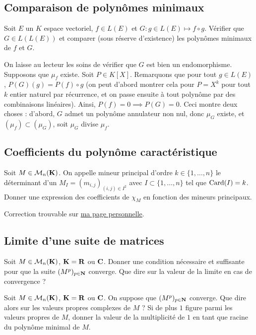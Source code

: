 \subsection{Comparaison de polynômes minimaux}
\begin{exercice}
 Soit $E$ un $K$ espace vectoriel, $f\in L(E)$ et $G:g\in L(E)\mapsto f\circ g$. Vérifier que $G\in L(L(E))$ et comparer (sous réserve d'existence) les polynômes minimaux de $f$ et $G$.
\end{exercice}

\begin{correction}
	On laisse au lecteur les soins de vérifier que $G$ est bien un endomorphisme. 
    Supposons que $\mu_f$ existe. 
    Soit $P\in K[X]$. 
    Remarquons que pour tout $g\in L(E)$, $P(G)(g)=P(f)\circ g$ (on peut d'abord montrer cela pour $P=X^k$ pour tout $k$ entier naturel par récurrence, et on passe ensuite à tout polynôme par des combinaisons linéaires).
    Ainsi, $P(f)=0\implies P(G)=0$. 
    Ceci montre deux choses : d'abord, $G$ admet un polynôme annulateur non nul, donc $\mu_G$ existe, et $(\mu_f)\subset (\mu_G)$, soit $\mu_G$ divise $\mu_f$. 
\end{correction}

\subsection{Coefficients du polynôme caractéristique}
\begin{exercice}
	Soit $M\in\mathcal M_n(\operatorname{\mathbf{K}})$. On appelle mineur principal d'ordre $k\in\lbrace1,\dots,n\rbrace$ le déterminant d'un $M_I=(m_{i,j})_{(i,j)\in I^2}$ avec $I\subset\lbrace 1,\dots,n\rbrace$ tel que $\operatorname{Card}(I)=k$. Donner une expression des coefficients de $\chi_M$ en fonction des mineurs principaux.
\end{exercice}

\begin{correction}
    Correction trouvable sur \href{https://perso.eleves.ens-rennes.fr/people/amar.ahmane}{ma page personnelle}.
\end{correction}

\subsection{Limite d'une suite de matrices}
\begin{exercice}
	Soit $M\in\mathcal M_n(\operatorname{\mathbf{K}})$, $\operatorname{\mathbf{K}} = \operatorname{\mathbf{R}}$ ou $\operatorname{\mathbf{C}}$. Donner une condition nécessaire et suffisante pour que la suite $(M^p)_{p\in\operatorname{\mathbf{N}}}$ converge. Que dire sur la valeur de la limite en cas de convergence ?

	Soit $M\in\mathcal M_n(\operatorname{\mathbf{K}})$, $\operatorname{\mathbf{K}} = \operatorname{\mathbf{R}}$ ou $\operatorname{\mathbf{C}}$. On suppose que $(M^p)_{p\in\operatorname{\mathbf{N}}}$ converge. Que dire alors sur les valeurs propres complexes de $M$ ? 
	Si de plus $1$ figure parmi les valeurs propres de $M$, donner la valeur de la multiplicité de $1$ en tant que racine du polynôme minimal de $M$.
\end{exercice}


